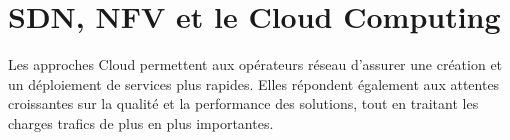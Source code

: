 



\section{SDN, NFV et le Cloud Computing}

Les approches Cloud permettent aux opérateurs réseau d'assurer une création et un déploiement de services plus rapides. Elles répondent également aux attentes croissantes sur la qualité et la performance des solutions, tout en traitant les charges trafics de plus en plus importantes.



